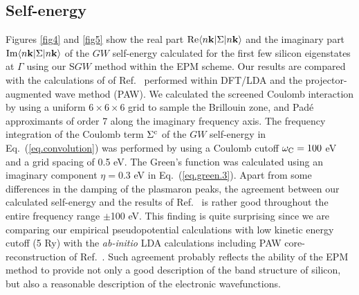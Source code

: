 \documentclass[twocolumn,prb,showpacs,superscriptaddress]{revtex4}
\def\wc{{\omega_{\rm C}}}
\def\k{{\bf k}}
\begin{document}
\subsection{Self-energy}\label{sec.5c}

Figures \ref{fig4} and \ref{fig5} show the real part ${\rm Re} \langle n\k| \Sigma|n\k\rangle$ 
and the imaginary part ${\rm Im} \langle n\k| \Sigma|n\k\rangle$ of the
$GW$ self-energy calculated for the first few silicon eigenstates at $\Gamma$
using our S$GW$ method within the EPM scheme. Our results are compared
with the calculations of of Ref.\  performed within DFT/LDA 
and the projector-augmented wave method (PAW).
We calculated the screened Coulomb interaction by using a uniform $6\times 6 \times 6$ grid 
to sample the Brillouin zone, and Pad\'e approximants of order 7 along the imaginary
frequency axis. The frequency integration of the Coulomb term $\Sigma^{\rm c}$ of the $GW$ 
self-energy in Eq.~(\ref{eq.convolution}) was performed by using a Coulomb cutoff 
$\wc = 100$ eV and a grid spacing of 0.5 eV. The Green's function was calculated
using an imaginary component $\eta = 0.3$ eV in Eq.\ (\ref{eq.green.3}).
Apart from some differences in the damping of the plasmaron peaks,
the agreement between our calculated self-energy and the results of Ref.~
is rather good throughout the entire frequency range $\pm$100 eV.
This finding is quite surprising since we are comparing our empirical pseudopotential
calculations with low kinetic energy cutoff (5 Ry) with the {\it ab-initio} LDA
calculations including PAW core-reconstruction of Ref.\ .
Such agreement probably reflects the ability of the EPM method to provide not only
a good description of the band structure of silicon, but also a reasonable
description of the electronic wavefunctions.
\end{document}
